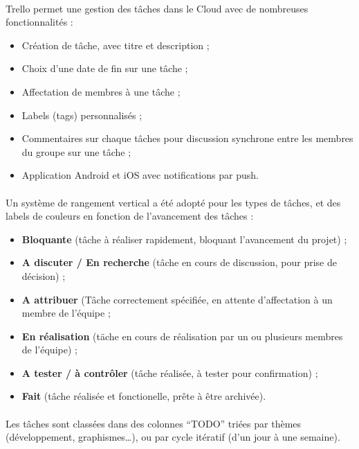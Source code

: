 \paragraph{}
Trello permet une gestion des tâches dans le Cloud avec de nombreuses fonctionnalités :
\begin{itemize}
\item Création de tâche, avec titre et description ;
\item Choix d’une date de fin sur une tâche ;
\item Affectation de membres à une tâche ;
\item Labels (tags) personnalisés ;
\item Commentaires sur chaque tâches pour discussion synchrone entre les membres du groupe sur une tâche ;
\item Application Android et iOS avec notifications par push.
\end{itemize}

\paragraph{}
Un système de rangement vertical a été adopté pour les types de tâches, et des labels de couleurs en fonction de l’avancement des tâches :

\begin{itemize}
\item \textbf{Bloquante} (tâche à réaliser rapidement, bloquant l’avancement du projet) ;
\item \textbf{A discuter / En recherche} (tâche en cours de discussion, pour prise de décision) ;
\item \textbf{A attribuer} (Tâche correctement spécifiée, en attente d’affectation à un membre de l’équipe ;
\item \textbf{En réalisation} (täche en cours de réalisation par un ou plusieurs membres de l’équipe) ;
\item \textbf{A tester / à contrôler} (tâche réalisée, à tester pour confirmation) ;
\item \textbf{Fait} (tâche réalisée et fonctionelle, prête à être archivée).
\end{itemize}

\paragraph{}
Les tâches sont classées dans des colonnes “TODO” triées par thèmes (développement, graphismes…), ou par cycle itératif (d’un jour à une semaine).

